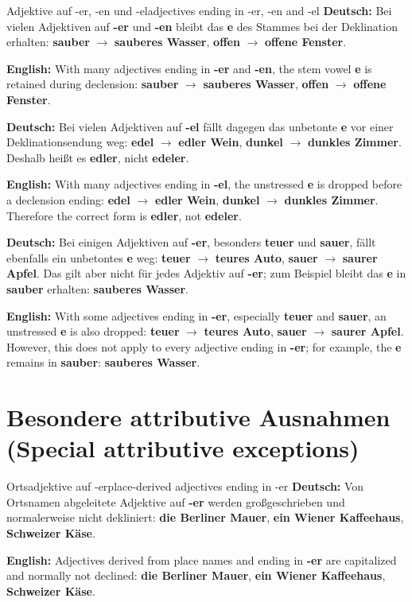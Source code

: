 \documentclass[a4paper,11pt]{article}
\newcommand{\GermanText}[1]{\textbf{Deutsch: }#1\par}
\newcommand{\EnglishText}[1]{{\small\color{SoftGray}\textbf{English: }#1\par}}
\begin{document}
\begin{grammarentry}{Adjektive auf -er, -en und -el}{adjectives ending in -er, -en and -el}
\GermanText{Bei vielen Adjektiven auf \textbf{-er} und \textbf{-en} bleibt das \textbf{e} des Stammes bei der Deklination erhalten: \textbf{sauber} $\rightarrow$ \textbf{sauberes Wasser}, \textbf{offen} $\rightarrow$ \textbf{offene Fenster}.}
\EnglishText{With many adjectives ending in \textbf{-er} and \textbf{-en}, the stem vowel \textbf{e} is retained during declension: \textbf{sauber} $\rightarrow$ \textbf{sauberes Wasser}, \textbf{offen} $\rightarrow$ \textbf{offene Fenster}.}

\GermanText{Bei vielen Adjektiven auf \textbf{-el} fällt dagegen das unbetonte \textbf{e} vor einer Deklinationsendung weg: \textbf{edel} $\rightarrow$ \textbf{edler Wein}, \textbf{dunkel} $\rightarrow$ \textbf{dunkles Zimmer}. Deshalb heißt es \textbf{edler}, nicht \textbf{edeler}.}
\EnglishText{With many adjectives ending in \textbf{-el}, the unstressed \textbf{e} is dropped before a declension ending: \textbf{edel} $\rightarrow$ \textbf{edler Wein}, \textbf{dunkel} $\rightarrow$ \textbf{dunkles Zimmer}. Therefore the correct form is \textbf{edler}, not \textbf{edeler}.}

\GermanText{Bei einigen Adjektiven auf \textbf{-er}, besonders \textbf{teuer} und \textbf{sauer}, fällt ebenfalls ein unbetontes \textbf{e} weg: \textbf{teuer} $\rightarrow$ \textbf{teures Auto}, \textbf{sauer} $\rightarrow$ \textbf{saurer Apfel}. Das gilt aber nicht für jedes Adjektiv auf \textbf{-er}; zum Beispiel bleibt das \textbf{e} in \textbf{sauber} erhalten: \textbf{sauberes Wasser}.}
\EnglishText{With some adjectives ending in \textbf{-er}, especially \textbf{teuer} and \textbf{sauer}, an unstressed \textbf{e} is also dropped: \textbf{teuer} $\rightarrow$ \textbf{teures Auto}, \textbf{sauer} $\rightarrow$ \textbf{saurer Apfel}. However, this does not apply to every adjective ending in \textbf{-er}; for example, the \textbf{e} remains in \textbf{sauber}: \textbf{sauberes Wasser}.}
\end{grammarentry}

\section{Besondere attributive Ausnahmen \textnormal{(Special attributive exceptions)}}

\begin{grammarentry}{Ortsadjektive auf -er}{place-derived adjectives ending in -er}
\GermanText{Von Ortsnamen abgeleitete Adjektive auf \textbf{-er} werden großgeschrieben und normalerweise nicht dekliniert: \textbf{die Berliner Mauer}, \textbf{ein Wiener Kaffeehaus}, \textbf{Schweizer Käse}.}
\EnglishText{Adjectives derived from place names and ending in \textbf{-er} are capitalized and normally not declined: \textbf{die Berliner Mauer}, \textbf{ein Wiener Kaffeehaus}, \textbf{Schweizer Käse}.}
\end{grammarentry}
\end{document}
